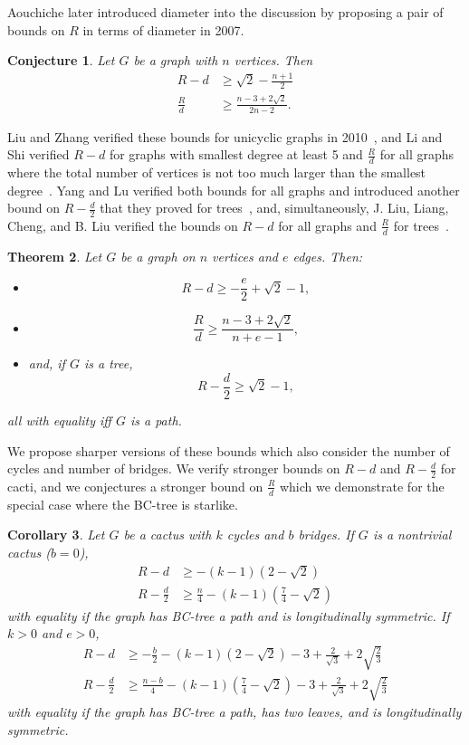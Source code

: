 \documentclass{amsart}
\newtheorem{thm}{Theorem}[section]%
\newtheorem{cor}[thm]{Corollary}
\newtheorem{conj}[thm]{Conjecture}
\theoremstyle{definition}
\begin{document}
Aouchiche later introduced diameter into the discussion by proposing a pair of bounds on $R$ in terms of diameter in 2007. 
\begin{conj}\cite{aouchiche2007conjecture}
Let $G$ be a graph with $n$ vertices. Then
\[\begin{split}
R - d &\geq \sqrt 2 - \frac{n+1}{2}\\
\frac{R}{d} &\geq \frac{n-3+2\sqrt 2}{2n-2}.
\end{split}\]
\end{conj}

Liu and Zhang verified these bounds for unicyclic graphs in 2010~\cite{zhang2010conjecture}, and Li and Shi verified $R-d$ for graphs with smallest degree at least 5 and $\frac{R}{d}$ for all graphs where the total number of vertices is not too much larger than the smallest degree~\cite{li2009randi}. Yang and Lu verified both bounds for all graphs and introduced another bound on $R-\frac{d}{2}$ that they proved for trees~\cite{yang2011randic}, and, simultaneously, J. Liu, Liang, Cheng, and B. Liu verified the bounds on $R-d$ for all graphs and $\frac{R}{d}$ for trees~\cite{liu2011proof}.
\begin{thm}\label{thm:d} 
Let $G$ be a graph on $n$ vertices and $e$ edges. Then: 
\begin{itemize}
\item \cite{yang2011randic,liu2011proof} \[R - d \geq - \frac{e}{2} + \sqrt 2 - 1 ,\]
\item \cite{yang2011randic} \[\frac{R}{d} \geq \frac{n-3+2\sqrt 2}{n+e-1},\]
\item \cite{yang2011randic} and, if $G$ is a tree, \[R-\frac{d}{2} \geq \sqrt 2 - 1,\]
\end{itemize}
all with equality iff $G$ is a path.
\end{thm}

We propose sharper versions of these bounds which also consider the number of cycles and number of bridges. We verify stronger bounds on $R-d$ and $R-\frac{d}{2}$ for cacti, and we conjectures a stronger bound on $\frac{R}{d}$ which we demonstrate for the special case where the BC-tree is starlike.

\begin{cor}\label{cor:d}
Let $G$ be a cactus with $k$ cycles and $b$ bridges. If $G$ is a nontrivial cactus ($b = 0$), 
\[\begin{split}
R-d &\geq -(k-1)\left(2-\sqrt 2\right)\\
R-\frac{d}{2} &\geq \frac{n}{4}-(k-1)\left(\frac{7}{4}-\sqrt 2\right)
\end{split}\]
with equality if the graph has BC-tree a path and is longitudinally symmetric. If $k>0$ and $e>0$,
\[\begin{split}
R-d &\geq -\frac{b}{2}-(k-1)\left(2-\sqrt 2\right) - 3 + \frac{2}{\sqrt 3} + 2 \sqrt{\frac{2}{3}}\\
R-\frac{d}{2} &\geq \frac{n-b}{4}-(k-1)\left(\frac{7}{4}-\sqrt 2\right)- 3 + \frac{2}{\sqrt 3} + 2 \sqrt{\frac{2}{3}}
\end{split}\]
with equality if the graph has BC-tree a path, has two leaves, and is longitudinally symmetric. 
\end{cor}
\end{document}
